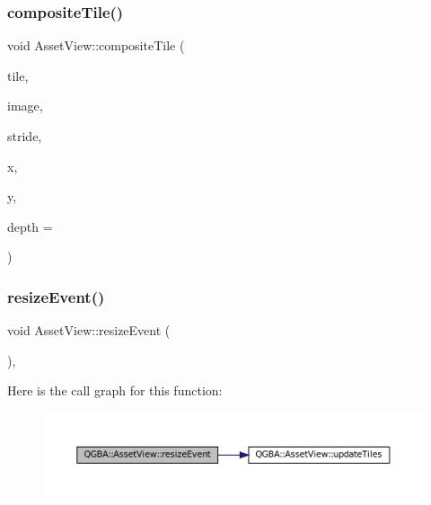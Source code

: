 \subsubsection{\texorpdfstring{composite\+Tile()}{compositeTile()}}
{\footnotesize\ttfamily void Asset\+View\+::composite\+Tile (\begin{DoxyParamCaption}\item[{const void $\ast$}]{tile,  }\item[{void $\ast$}]{image,  }\item[{size\+\_\+t}]{stride,  }\item[{size\+\_\+t}]{x,  }\item[{size\+\_\+t}]{y,  }\item[{\mbox{\hyperlink{ioapi_8h_a787fa3cf048117ba7123753c1e74fcd6}{int}}}]{depth = {} }\end{DoxyParamCaption})\hspace{0.3cm}{\ttfamily [static]}}

\mbox{\label{class_q_g_b_a_1_1_asset_view_ac4b7532fd5b92a097f5930df993ef215}} 
\subsubsection{\texorpdfstring{resize\+Event()}{resizeEvent()}}
{\footnotesize\ttfamily void Asset\+View\+::resize\+Event (\begin{DoxyParamCaption}\item[{Q\+Resize\+Event $\ast$}]{ }\end{DoxyParamCaption})\hspace{0.3cm}{\ttfamily [override]}, {\ttfamily [protected]}}

Here is the call graph for this function\+:
\nopagebreak
\begin{figure}[H]
\begin{center}
\leavevmode
\includegraphics[width=350pt]{class_q_g_b_a_1_1_asset_view_ac4b7532fd5b92a097f5930df993ef215_cgraph}
\end{center}
\end{figure}
\mbox{\label{class_q_g_b_a_1_1_asset_view_a56855e2ceca48f1940a5db614819d509}} 
